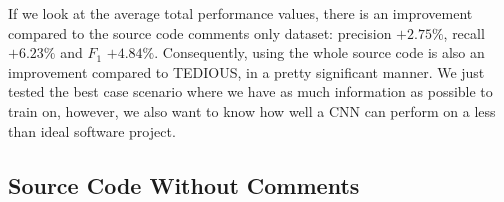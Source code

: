 If we look at the average total performance values, there is an improvement compared to the source code comments only dataset: precision $+ 2.75\%$, recall $+ 6.23\%$ and $F_1$ $+ 4.84\%$. Consequently, using the whole source code is also an improvement compared to TEDIOUS, in a pretty significant manner. We just tested the best case scenario where we have as much information as possible to train on, however, we also want to know how well a CNN can perform on a less than ideal software project.


\subsection{Source Code Without Comments}


\begin{table}[t]
	\caption{Within-project prediction: results of CNN for each system using source code without comments}
	\label{tab:withoutcomments}
	\centering\scriptsize
	\vspace{-3mm}
\end{table}

